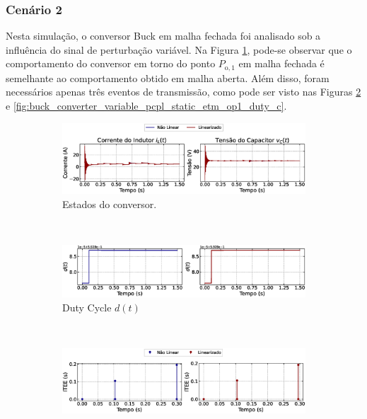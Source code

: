 \subsubsection{Cenário 2}

Nesta simulação, o conversor Buck em malha fechada foi analisado sob a influência do sinal de perturbação variável. Na Figura \ref{fig:buck_converter_variable_pcpl_static_etm_op1_duty_a}, pode-se observar que o comportamento do conversor em torno do ponto $P_{\mathrm{o}, 1}$ em malha fechada é semelhante ao comportamento obtido em malha aberta. Além disso, foram necessários apenas três eventos de transmissão, como pode ser visto nas Figuras \ref{fig:buck_converter_variable_pcpl_static_etm_op1_duty_b} e \ref{fig:buck_converter_variable_pcpl_static_etm_op1_duty_c}.

\begin{figure}[H]
  \centering
  \captionsetup{justification=centering}
  \begin{subfigure}{1.\textwidth}
    \centering
    \includegraphics[width=1.\textwidth]{figuras/static-etm/buck/sim2/op1/result.eps}
    \caption{Estados do conversor.}
    \label{fig:buck_converter_variable_pcpl_static_etm_op1_duty_a}
  \end{subfigure}
  \\[6pt]
  \begin{subfigure}{1.\textwidth}
    \centering
    \includegraphics[width=1.\textwidth]{figuras/static-etm/buck/sim2/op1/duty-cycle.eps}
    \caption{Duty Cycle $d(t)$}
    \label{fig:buck_converter_variable_pcpl_static_etm_op1_duty_b}
  \end{subfigure}
  \\[6pt]
  \begin{subfigure}{1.\textwidth}
    \centering
    \includegraphics[width=1.\textwidth]{figuras/static-etm/buck/sim2/op1/inter-event-times.eps}

\end{subfigure}
\end{figure}
